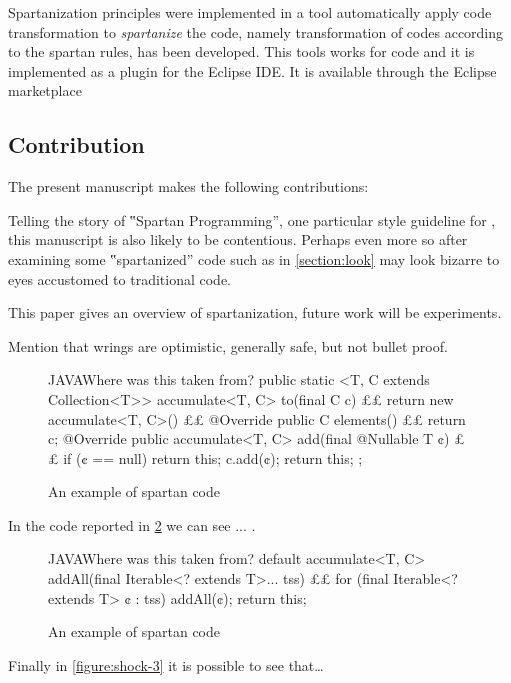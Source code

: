 Spartanization principles were implemented in a tool automatically apply code
transformation to \emph{spartanize} the code, namely transformation of codes
according to the spartan rules, has been developed.
This tools works for \Java code and it is implemented as a plugin for the
Eclipse IDE\@. It is available through the Eclipse
marketplace



\subsection{Contribution}

The present manuscript makes the following contributions:

Telling the story of ‟Spartan Programming”, one particular style guideline for
\Java, this manuscript is also likely to be contentious. Perhaps even more so
after examining some ‟spartanized” code such as in \cref{section:look}
may look bizarre to eyes accustomed to traditional \Java code.


This paper gives an overview of spartanization, future work will be
experiments.

Mention that wrings are optimistic, generally safe, but not bullet proof.

\begin{figure}
\label{figure:first}
\caption{An example of spartan code}
\begin{Code}{JAVA}{Where was this taken from?}
public static <T, C extends Collection<T>> accumulate<T, C>
to(final C c) {££
return new accumulate<T, C>() {££
@Override public C elements() {££
return c;
}
@Override public accumulate<T, C>
add(final @Nullable T ¢) {££
if (¢ == null)
return this;
c.add(¢);
return this;
}
};
}
\end{Code}
\end{figure}

In the code reported in \cref{figure:shock-2} we can see ... .

\begin{figure}
\label{figure:shock-2}
\caption{An example of spartan code}
\begin{Code}{JAVA}{Where was this taken from?}
default accumulate<T, C>
addAll(final Iterable<? extends T>... tss) {££
for (final Iterable<? extends T> ¢ : tss)
addAll(¢);
return this;
}
\end{Code}

\end{figure}
Finally in \cref{figure:shock-3} it is possible to see that…


